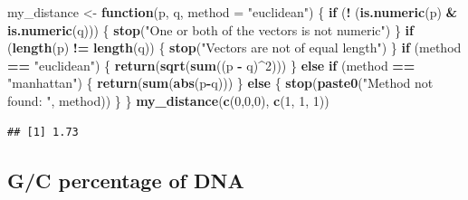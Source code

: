 \documentclass[]{book}
\newenvironment{Shaded}{\begin{snugshade}}{\end{snugshade}}
\newcommand{\ControlFlowTok}[1]{\textcolor[rgb]{0.13,0.29,0.53}{\textbf{#1}}}
\newcommand{\DataTypeTok}[1]{\textcolor[rgb]{0.13,0.29,0.53}{#1}}
\newcommand{\DecValTok}[1]{\textcolor[rgb]{0.00,0.00,0.81}{#1}}
\newcommand{\KeywordTok}[1]{\textcolor[rgb]{0.13,0.29,0.53}{\textbf{#1}}}
\newcommand{\NormalTok}[1]{#1}
\newcommand{\OperatorTok}[1]{\textcolor[rgb]{0.81,0.36,0.00}{\textbf{#1}}}
\newcommand{\StringTok}[1]{\textcolor[rgb]{0.31,0.60,0.02}{#1}}
\begin{document}
\begin{Shaded}
\begin{Highlighting}[]
\NormalTok{my_distance <-}\StringTok{ }\ControlFlowTok{function}\NormalTok{(p, q, }\DataTypeTok{method =} \StringTok{"euclidean"}\NormalTok{) \{}
  \ControlFlowTok{if}\NormalTok{ (}\OperatorTok{!}\StringTok{ }\NormalTok{(}\KeywordTok{is.numeric}\NormalTok{(p) }\OperatorTok{&}\StringTok{ }\KeywordTok{is.numeric}\NormalTok{(q))) \{}
    \KeywordTok{stop}\NormalTok{(}\StringTok{"One or both of the vectors is not numeric"}\NormalTok{)}
\NormalTok{  \}}
  \ControlFlowTok{if}\NormalTok{ (}\KeywordTok{length}\NormalTok{(p) }\OperatorTok{!=}\StringTok{ }\KeywordTok{length}\NormalTok{(q)) \{}
    \KeywordTok{stop}\NormalTok{(}\StringTok{"Vectors are not of equal length"}\NormalTok{)}
\NormalTok{  \}}
  \ControlFlowTok{if}\NormalTok{ (method }\OperatorTok{==}\StringTok{ "euclidean"}\NormalTok{) \{}
    \KeywordTok{return}\NormalTok{(}\KeywordTok{sqrt}\NormalTok{(}\KeywordTok{sum}\NormalTok{((p }\OperatorTok{-}\StringTok{ }\NormalTok{q)}\OperatorTok{^}\DecValTok{2}\NormalTok{)))}
\NormalTok{  \}}
  \ControlFlowTok{else} \ControlFlowTok{if}\NormalTok{ (method }\OperatorTok{==}\StringTok{ "manhattan"}\NormalTok{) \{}
    \KeywordTok{return}\NormalTok{(}\KeywordTok{sum}\NormalTok{(}\KeywordTok{abs}\NormalTok{(p}\OperatorTok{-}\NormalTok{q)))}
\NormalTok{  \}}
  \ControlFlowTok{else}\NormalTok{ \{}
    \KeywordTok{stop}\NormalTok{(}\KeywordTok{paste0}\NormalTok{(}\StringTok{"Method not found: "}\NormalTok{, method))}
\NormalTok{  \}}
\NormalTok{\}}
\KeywordTok{my_distance}\NormalTok{(}\KeywordTok{c}\NormalTok{(}\DecValTok{0}\NormalTok{,}\DecValTok{0}\NormalTok{,}\DecValTok{0}\NormalTok{), }\KeywordTok{c}\NormalTok{(}\DecValTok{1}\NormalTok{, }\DecValTok{1}\NormalTok{, }\DecValTok{1}\NormalTok{))}
\end{Highlighting}
\end{Shaded}

\begin{verbatim}
## [1] 1.73
\end{verbatim}

\hypertarget{gc-percentage-of-dna-1}{%
\subsection{G/C percentage of DNA}\label{gc-percentage-of-dna-1}}
\end{document}

